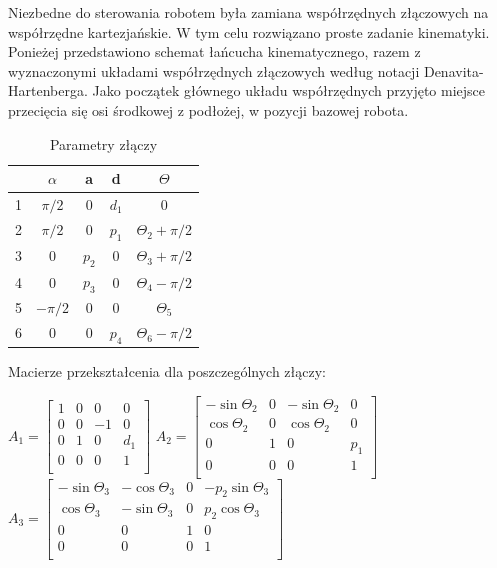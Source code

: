 Niezbedne do sterowania robotem była zamiana współrzędnych złączowych na współrzędne kartezjańskie. W tym celu rozwiązano proste zadanie kinematyki. 
Ponieżej przedstawiono schemat łańcucha kinematycznego, razem z wyznaczonymi układami współrzędnych złączowych według notacji Denavita-Hartenberga. Jako początek głównego układu współrzędnych przyjęto miejsce przecięcia się osi środkowej z podłożej, w pozycji bazowej robota.
\begin{table}[h]
\begin{center}
\begin{tabular}{r|c c c c}
   & $\alpha$ 	& a 		& d 		& $\Theta$ 			\\ \hline
1 & $\pi/2$ 	& 0 		& $d_1$ 	& 0 					\\
2 & $\pi/2$ 	& 0 		& $p_1$ 	& $\Theta_2+\pi/2$ 	\\
3 & 0 		& $p_2$ 	& 0  	& $\Theta_3+\pi/2$ 	\\
4 & 0 		& $p_3$ 	& 0 		& $\Theta_4-\pi/2$ 	\\
5 & $-\pi/2$ 	& 0		& 0 		& $\Theta_5$			\\
6 & 0 		& 0 		& $p_4$	& $\Theta_6-\pi/2$		\\
\end{tabular}
\caption{Parametry złączy}
\end{center}
\end{table}

Macierze przekształcenia dla poszczególnych złączy:

\vspace{5mm}

$A_1 = 
\begin{bmatrix}
1 		& 0 		& 0 		& 0 		\\
0 		& 0 		& -1		& 0 		\\
0 		& 1		& 0 		& d_1	\\
0 		& 0 		& 0 		& 1 		\\
\end{bmatrix}$
$A_2 = 
\begin{bmatrix}
-\sin \Theta_2		& 0 		& -\sin \Theta_2	& 0 		\\
\cos \Theta_2		& 0 		& \cos \Theta_2	& 0 		\\
0 				& 1 		& 0 				& p_1	\\
0 				& 0 		& 0 				& 1 		\\
\end{bmatrix}$
$A_3 = 
\begin{bmatrix}
-\sin \Theta_3 	& -\cos \Theta_3	& 0 		& -p_2\sin \Theta_3 	\\
\cos \Theta_3		& -\sin \Theta_3	& 0 		& p_2\cos \Theta_3 	\\
0 				& 0 				& 1 		& 0 					\\
0 				& 0 				& 0 		& 1 					\\
\end{bmatrix}$

